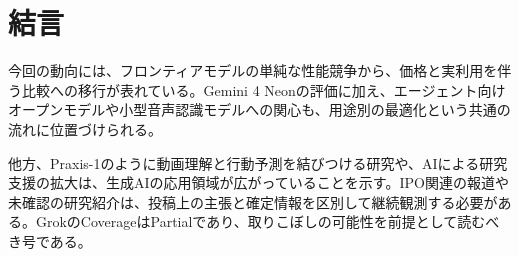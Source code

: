 \section{結言}
今回の動向には、フロンティアモデルの単純な性能競争から、価格と実利用を伴う比較への移行が表れている。Gemini 4 Neonの評価に加え、エージェント向けオープンモデルや小型音声認識モデルへの関心も、用途別の最適化という共通の流れに位置づけられる。

他方、Praxis-1のように動画理解と行動予測を結びつける研究や、AIによる研究支援の拡大は、生成AIの応用領域が広がっていることを示す。IPO関連の報道や未確認の研究紹介は、投稿上の主張と確定情報を区別して継続観測する必要がある。GrokのCoverageはPartialであり、取りこぼしの可能性を前提として読むべき号である。
